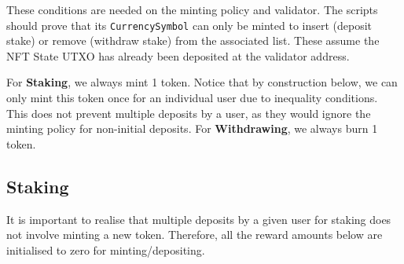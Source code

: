 \documentclass[10pt, a4paper]{article}
\theoremstyle{definition}
\begin{document}
These conditions are needed on the minting policy and validator. The scripts should prove that its \texttt{CurrencySymbol} can only be minted to insert (deposit stake) or remove (withdraw stake) from the associated list. These assume the NFT State UTXO has already been deposited at the validator address.

For \textbf{Staking}, we always mint 1 token. Notice that by construction below, we can only mint this token once for an individual user due to inequality conditions. This does not prevent multiple deposits by a user, as they would ignore the minting policy for non-initial deposits.
For \textbf{Withdrawing}, we always burn 1 token.

\subsection{Staking}\label{subsection:staking}

It is important to realise that multiple deposits by a given user for staking does not involve minting a new token. Therefore, all the reward amounts below are initialised to zero for minting/depositing.
\end{document}
